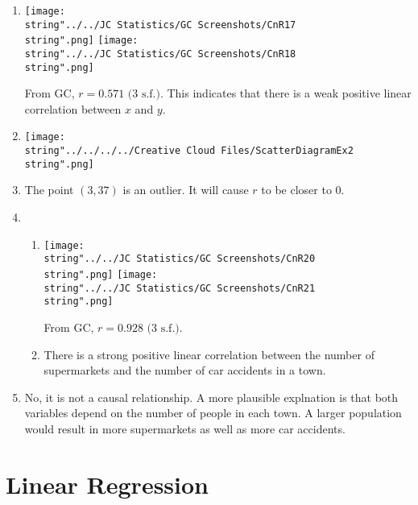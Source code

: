 \documentclass[11pt,a4paper]{book}
\begin{document}
\begin{example}
\Solution

\begin{enumerate}[label=(\alph*)]

\item  \texttt{[image: \\string"../../JC Statistics/GC Screenshots/CnR17\\string".png]}
\hspace{1cm}\texttt{[image: \\string"../../JC Statistics/GC Screenshots/CnR18\\string".png]}

From GC, $r=0.571\text{ (3 s.f.)}$. This indicates that there is
a weak positive linear correlation between $x$ and $y$.

\item  \texttt{[image: \\string"../../../../Creative Cloud Files/ScatterDiagramEx2\\string".png]}

\item  The point $\left(3,37\right)$ is an outlier. It will cause
$r$ to be closer to $0$.

\item  \begin{enumerate}[label=(\roman*)]

\item  \texttt{[image: \\string"../../JC Statistics/GC Screenshots/CnR20\\string".png]}
\hspace{1cm}\texttt{[image: \\string"../../JC Statistics/GC Screenshots/CnR21\\string".png]}

From GC, $r=0.928\text{ (3 s.f.)}$.

\item  There is a strong positive linear correlation between the
number of supermarkets and the number of car accidents in a town.

\end{enumerate}

\item  No, it is not a causal relationship. A more plausible explnation
is that both variables depend on the number of people in each town.
A larger population would result in more supermarkets as well as more
car accidents.

\end{enumerate}

\end{example}

\newpage

\section{Linear Regression}
\end{document}
